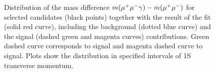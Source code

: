 \begin{figure}[H]
  \setlength{\unitlength}{1mm}
  \centering




  \caption {\small 
    Distribution of the mass difference $m(\mu^+\mu^- \gamma) - m(\mu^+\mu^-)$ for selected
    \chib candidates (black points) together with the result of the fit 
    (solid red curve), including the background (dotted blue curve) and the signal 
    (dashed green and magenta curves) contributions. Green dashed curve corresponds
    to \chibone signal and magenta dashed curve to \chibtwo signal. Plots
    show the distribution in specified intervals of \Y1S transverse momentum.
   }
\label{fig:chib:ups1s:conv}
\end{figure}